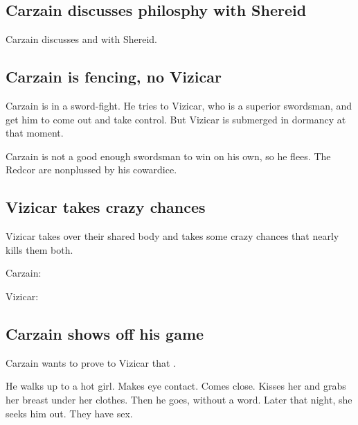 \begin{garbage}
\subsection{Carzain discusses philosphy with Shereid}
Carzain discusses  and  with Shereid. 








\subsection{Carzain is fencing, no Vizicar}
Carzain is in a sword-fight. He tries to  Vizicar, who is a superior swordsman, and get him to come out and take control. But Vizicar is submerged in dormancy at that moment. 

Carzain is not a good enough swordsman to win on his own, so he flees. The Redcor are nonplussed by his cowardice. 










\subsection{Vizicar takes crazy chances}
Vizicar takes over their shared body and takes some crazy chances that nearly kills them both. 

\begin{prose}
  Carzain: 
  
  Vizicar: 
\end{prose}










\subsection{Carzain shows off his game}
Carzain wants to prove to Vizicar that . 

He walks up to a hot girl. 
Makes eye contact. 
Comes close. 
Kisses her and grabs her breast under her clothes. 
Then he goes, without a word. 
Later that night, she seeks him out. 
They have sex. 


\end{garbage}

